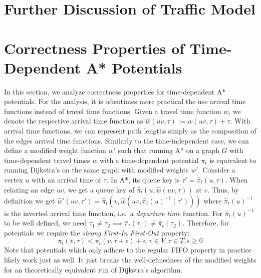 \documentclass[a4paper,UKenglish,cleveref, autoref, thm-restate,anonymous]{lipics-v2021}
\begin{document}




\appendix

\section{Further Discussion of Traffic Model}\label{sec:appendix:model}


\section{Correctness Properties of Time-Dependent A* Potentials}\label{sec:appendix:correctness}

In this section, we analyze correctness properties for time-dependent A* potentials.
For the analysis, it is oftentimes more practical the use arrival time functions instead of travel time functions.
Given a travel time function $w$, we denote the respective arrival time function as $\hat{w}(uv, \tau) := w(uv, \tau) + \tau$.
With arrival time functions, we can represent path lengths simply as the composition of the edges arrival time functions.
Similarly to the time-independent case, we can define a modified weight function $w'$ such that running A* on a graph $G$ with time-dependent travel times $w$ with a time-dependent potential $\pi_t$ is equivalent to running Dijkstra's on the same graph with modified weights $w'$.
Consider a vertex $u$ with an arrival time of $\tau$.
In A*, its queue key is $\tau' = \hat{\pi}_t(u, \tau)$.
When relaxing an edge $uv$, we get a queue key of $\hat{\pi}_t(u, \hat{w}(uv, \tau))$ at $v$.
Thus, by definition we get $\hat{w}'(uv, \tau') = \hat{\pi}_t(v, \hat{w}(uv, \hat{\pi}_t(u)^{-1}(\tau')))$ where $\hat{\pi}_t(u)^{-1}$ is the inverted arrival time function, i.e.\ a \emph{departure time} function.
For $\hat{\pi}_t(u)^{-1}$ to be well defined, we need $\tau_1 \neq \tau_2 \implies \hat{\pi}_t(\tau_1) \neq \hat{\pi}_t(\tau_2)$.
Therefore, for potentials we require the \emph{strong First-In First-Out} property:
\[
\pi_t(v, \tau) < \pi_t(v, \tau + \epsilon) + \epsilon, v \in V, \tau \in T, \epsilon \geq 0
\]
Note that potentials which only adhere to the regular FIFO property in practice likely work just as well.
It just breaks the well-definedness of the modified weights for an theoretically equivalent run of Dijkstra's algorithm.
\end{document}
